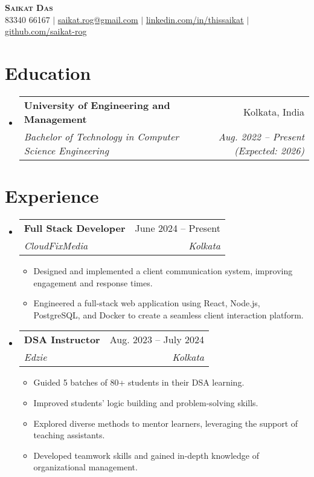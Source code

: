\documentclass[letterpaper,11pt]{article}
\makeatletter
\newcommand{\resumeItem}[1]{
  \item\small{
    {#1 \vspace{-2pt}}
  }
}
\newcommand{\resumeSubheading}[4]{
  \vspace{-2pt}\item
    \begin{tabular*}{0.97\textwidth}[t]{l@{\extracolsep{\fill}}r}
      \textbf{#1} & #2 \\
      \textit{\small#3} & \textit{\small #4} \\
    \end{tabular*}\vspace{-7pt}
}
\newcommand{\resumeSubHeadingListStart}{\begin{itemize}[leftmargin=0.15in, label={}]}
\newcommand{\resumeSubHeadingListEnd}{\end{itemize}}
\newcommand{\resumeItemListStart}{\begin{itemize}}
\newcommand{\resumeItemListEnd}{\end{itemize}\vspace{-5pt}}
\makeatother
\begin{document}
\begin{center}
    \textbf{\Huge \scshape Saikat Das} \\ \vspace{1pt}
    \small 83340 66167 $|$ \href{mailto:saikat.rog@gmail.com}{\underline{saikat.rog@gmail.com}} $|$ 
    \href{https://www.linkedin.com/in/thissaikat/}{\underline{linkedin.com/in/thissaikat}} $|$
    \href{https://github.com/saikat-rog}{\underline{github.com/saikat-rog}}
\end{center}

\section{Education}
  \resumeSubHeadingListStart
    \resumeSubheading
      {University of Engineering and Management}{Kolkata, India}
      {Bachelor of Technology in Computer Science Engineering}{Aug. 2022 -- Present (Expected: 2026)}
  \resumeSubHeadingListEnd

\section{Experience}
  \resumeSubHeadingListStart
    \resumeSubheading
      {Full Stack Developer}{June 2024 -- Present}
      {CloudFixMedia}{Kolkata}
      \resumeItemListStart
        \resumeItem{Designed and implemented a client communication system, improving engagement and response times.}
        \resumeItem{Engineered a full-stack web application using React, Node.js, PostgreSQL, and Docker to create a seamless client interaction platform.}
      \resumeItemListEnd

    \resumeSubheading
      {DSA Instructor}{Aug. 2023 -- July 2024}
      {Edzie}{Kolkata}
      \resumeItemListStart
        \resumeItem{Guided 5 batches of 80+ students in their DSA learning.}
        \resumeItem{Improved students' logic building and problem-solving skills.}
        \resumeItem{Explored diverse methods to mentor learners, leveraging the support of teaching assistants.}
        \resumeItem{Developed teamwork skills and gained in-depth knowledge of organizational management.}
      \resumeItemListEnd

  \resumeSubHeadingListEnd

\end{document}
